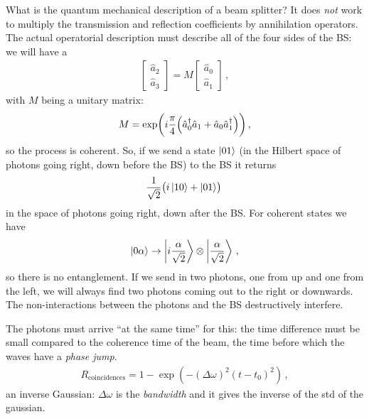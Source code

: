 \documentclass[main.tex]{subfiles}
\begin{document}
What is the quantum mechanical description of a beam splitter? 
It does \emph{not} work to multiply the transmission and reflection coefficients by annihilation operators. 
The actual operatorial description must describe all of the four sides of the BS: we will have a 
%
\begin{align}
\left[\begin{array}{c}
\hat{a}_{2}  \\ 
\hat{a}_{3}
\end{array}\right] = 
M \left[\begin{array}{c}
\hat{a}_0  \\ 
\hat{a}_{1}
\end{array}\right]
\,,
\end{align}
%
with \(M\) being a unitary matrix: 
%
\begin{align}
M = \exp(i \frac{\pi}{4} \qty(\hat{a}^\dag_{0} \hat{a}_{1} + \hat{a}_{0} \hat{a}_{1}^\dag))
\,,
\end{align}
%
so the process is coherent. So, if we send a state \(\ket{01}\) (in the Hilbert space of photons going right, down before the BS) to the BS it returns 
%
\begin{align}
\frac{1}{\sqrt{2}} \qty(i \ket{10} + \ket{01})
\,
\end{align}
%
in the space of photons going right, down after the BS. 
For coherent states we have 
%
\begin{align}
\ket{0 \alpha }  \rightarrow \ket{i \frac{\alpha}{\sqrt{2}}} \otimes \ket{\frac{\alpha}{\sqrt{2}}}
\,,
\end{align}
%
so there is no entanglement. 
If we send in  two photons, one from up and one from the left, we will always find two photons coming out to the right or downwards. The non-interactions between the photons and the BS destructively interfere. 

The photons must arrive ``at the same time'' for this: the time difference must be small compared to the coherence time of the beam, the time before which the waves have a \emph{phase jump}.  
%
\begin{align}
R _{\text{coincidences}} = 1 - \exp(- (\Delta \omega )^2 (t-t_0 )^2)
\,,
\end{align}
%
an inverse Gaussian: \(\Delta \omega \) is the \emph{bandwidth} and it gives the inverse of the std of the gaussian. 
\end{document}
